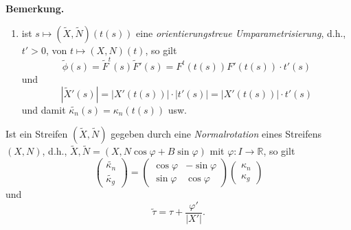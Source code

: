 \documentclass[a4paper,oneside,11pt,DIV=12,parskip=half]{scrartcl}
\newcommand{\R}{\mathbb R}
\newenvironment{note}{\textbf{Bemerkung.} ~~~~}{}
\newenvironment{lemma, definition}{\textbf{Lemma und Definition.} ~~~~}{}
\newenvironment{note, example}{\textbf{Bemerkung und Beispiel.} ~~~~}{}
\newenvironment{note, definition}{\textbf{Bemerkung und Definition.} ~~~~}{}
\begin{document}
\begin{lemma, definition}
\begin{note}
\begin{enumerate}
		\item ist $s \mapsto (\widetilde{X}, \widetilde{N})(t(s))$ eine \textit{orientierungstreue Umparametrisierung}, d.h., $t' >0$, von $t \mapsto (X,N)(t)$, so gilt
		\[\widetilde{\phi}(s) = \widetilde{F}^t(s)\widetilde{F}'(s) = F^t(t(s))F'(t(s))\cdot t'(s) \] und \[ |\widetilde{X}'(s)| = |X'(t(s))|\cdot|t'(s)| =  |X'(t(s))|\cdot t'(s) \] und damit $\widetilde{\kappa_n}(s)= \kappa_n(t(s))$ usw.
	\end{enumerate}
\end{note}

\begin{note, definition}
	Ist ein Streifen $(\widetilde{X},\widetilde{N})$ gegeben durch eine \textit{Normalrotation} eines Streifens $(X,N)$, d.h., $\widetilde{X}, \widetilde{N} = (X,N \cos \varphi + B \sin \varphi)$ mit $\varphi: I \rightarrow \R$, so gilt
	\begin{equation*}
	\begin{pmatrix} 
		\widetilde{\kappa_n}\\
		\widetilde{\kappa_g}
	\end{pmatrix}
	=
	 \begin{pmatrix} 
	 \cos \varphi & - \sin \varphi \\
	 \sin \varphi & \cos \varphi
	 \end{pmatrix}
	 \begin{pmatrix}
	 \kappa_n\\
	 \kappa_g
	 \end{pmatrix}
	\end{equation*} und
	$$\widetilde{\tau} = \tau + \frac{\varphi'}{|X'|}  .$$
	
	
\end{note, definition}
	
\end{lemma, definition}
\end{document}
